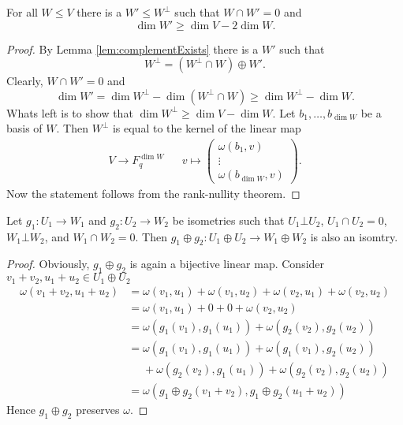 \begin{lemma}\label{lem:largeOrthogonal}
For all $W\leq V$ there is a $W'\leq W^\bot$ such that $W\cap W'=0$ and \[\dim W'\geq \dim V-2\dim W.\]
\end{lemma}
\begin{proof}
By Lemma \ref{lem:complementExists} there is a $W'$ such that 
\[W^\bot=(W^\bot\cap W)\oplus W'.\]
Clearly, $W\cap W'=0$ and 
\[\dim W'=\dim W^\bot - \dim (W^\bot\cap W)\geq \dim W^\bot- \dim W.\]
Whats left is to show that $\dim W^\bot\geq \dim V-\dim W$. Let $b_1,\dots, b_{\dim W}$ be a basis of $W$. Then $W^\bot$ is equal to the kernel of the linear map 
\begin{align*}
V\to F_q^{\dim W}&& v\mapsto
\begin{pmatrix}
\omega(b_1,v)\\
\vdots\\
\omega(b_{\dim W},v)
\end{pmatrix}.
\end{align*}
Now the statement follows from the rank-nullity theorem.
\end{proof}

\begin{lemma}\label{lem:isomSum}
Let $g_1\colon U_1\to W_1$ and $g_2\colon U_2\to W_2$ be isometries such that $U_1\bot U_2$, $U_1\cap U_2=0$, $W_1\bot W_2$, and $W_1\cap W_2=0$.
Then $g_1\oplus g_2\colon U_1\oplus U_2\to W_1\oplus W_2$ is also an isomtry.
\end{lemma}
\begin{proof}
Obviously, $g_1\oplus g_2$ is again a bijective linear map. Consider $v_1+v_2, u_1+u_2\in U_1\oplus U_2$
\begin{align*}
\omega(v_1+v_2, u_1+u_2)&=\omega(v_1, u_1)+\omega(v_1, u_2)+\omega(v_2, u_1)+\omega(v_2, u_2)\\
&=\omega(v_1, u_1)+0+0+\omega(v_2, u_2) \tag{$U_1\bot U_2$}\\
&=\omega(g_1(v_1), g_1(u_1))+\omega(g_2(v_2), g_2(u_2))\\
&=\omega(g_1(v_1), g_1(u_1))+\omega(g_1(v_1), g_2(u_2))\\ &\phantom{={}}+\omega(g_2(v_2), g_1(u_1))+\omega(g_2(v_2), g_2(u_2))\tag{$W_1\bot W_2$}\\
&=\omega(g_1\oplus g_2(v_1+v_2), g_1\oplus g_2(u_1+u_2))
\end{align*}
Hence $g_1\oplus g_2$ preserves $\omega$.
\end{proof}

